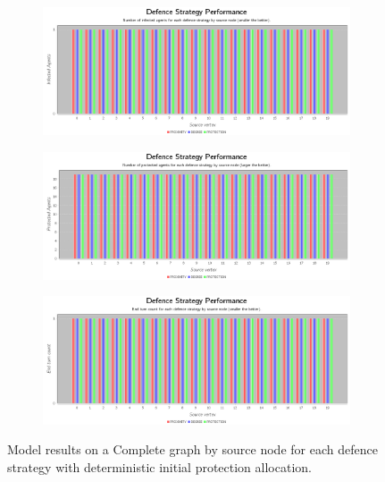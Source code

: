 \documentclass[results.tex]{subfiles}
\begin{document}
\begin{figure}[!ht]
\centering
     \begin{subfigure}[b]{0.9\textwidth}
         \centering
         \includegraphics[width=\textwidth]{Complete/Deterministic/DeterministicInfectedChart}
         \label{fig:com-det-infected}
     \end{subfigure}
     \vfill
     \begin{subfigure}[b]{0.9\textwidth}
         \centering
         \includegraphics[width=\textwidth]{Complete/Deterministic/DeterministicProtectedChart}
         \label{fig:com-det-protected}
     \end{subfigure}
     \vfill
     \begin{subfigure}[b]{0.9\textwidth}
         \centering
         \includegraphics[width=\textwidth]{Complete/Deterministic/DeterministicEndTurnChart}
         \label{fig:com-det-end}
     \end{subfigure}
        \caption{Model results on a Complete graph by source node for each defence strategy with deterministic initial protection allocation.}
        \label{fig:com-det-charts}
\end{figure}
\end{document}
